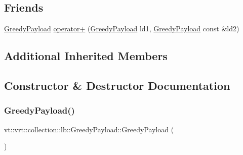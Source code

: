 \subsection*{Friends}
\begin{DoxyCompactItemize}
\item 
\hyperlink{structvt_1_1vrt_1_1collection_1_1lb_1_1_greedy_payload}{Greedy\+Payload} \hyperlink{structvt_1_1vrt_1_1collection_1_1lb_1_1_greedy_payload_acda457120417c7df7bc1e012f4e84b00}{operator+} (\hyperlink{structvt_1_1vrt_1_1collection_1_1lb_1_1_greedy_payload}{Greedy\+Payload} ld1, \hyperlink{structvt_1_1vrt_1_1collection_1_1lb_1_1_greedy_payload}{Greedy\+Payload} const \&ld2)
\end{DoxyCompactItemize}
\subsection*{Additional Inherited Members}


\subsection{Constructor \& Destructor Documentation}
\mbox{\label{structvt_1_1vrt_1_1collection_1_1lb_1_1_greedy_payload_ad4da82c6ba27244f3258f8a4e76871f8}} 
\subsubsection{\texorpdfstring{Greedy\+Payload()}{GreedyPayload()}\hspace{0.1cm}{\footnotesize\ttfamily [1/2]}}
{\footnotesize\ttfamily vt\+::vrt\+::collection\+::lb\+::\+Greedy\+Payload\+::\+Greedy\+Payload (\begin{DoxyParamCaption}{ }\end{DoxyParamCaption})\hspace{0.3cm}{\ttfamily [default]}}

\mbox{\label{structvt_1_1vrt_1_1collection_1_1lb_1_1_greedy_payload_a7de799b4cb1eb3681b3a7aba4b60f8d0}} 
